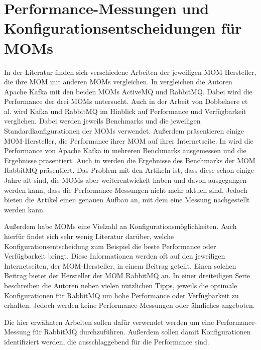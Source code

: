 \section{Performance-Messungen und Konfigurationsentscheidungen für MOMs}
\label{sec:config_mom}
In der Literatur finden sich verschiedene Arbeiten der jeweiligen MOM-Hersteller, die ihre MOM mit anderen MOMs vergleichen. In \cite{kafka} vergleichen die Autoren Apache Kafka mit den beiden MOMs ActiveMQ und RabbitMQ. Dabei wird die Performance der drei MOMs untersucht. Auch in der Arbeit von Dobbelaere et al. \cite{Dobbelaere2017} wird Kafka und RabbitMQ im Hinblick auf Performance und Verfügbarkeit verglichen. Dabei werden jeweils Benchmarks und die jeweiligen Standardkonfigurationen der MOMs verwendet. Außerdem präsentieren einige MOM-Hersteller, die Performance ihrer MOM auf ihrer Internetseite. In \cite{kafkaconfig} wird die Performance von Apache Kafka in mehreren Benchmarks ausgemessen und die Ergebnisse präsentiert. Auch in \cite{rabbitperf} werden die Ergebnisse des Benchmarks der MOM RabbitMQ präsentiert. Das Problem mit den Artikeln ist, dass diese schon einige Jahre alt sind, die MOMs aber weiterentwickelt haben und davon ausgegangen werden kann, dass die Performance-Messungen nicht mehr aktuell sind. Jedoch bieten die Artikel einen genauen Aufbau an, mit dem eine Messung nachgestellt werden kann. \par
Außerdem habe MOMs eine Vielzahl an Konfigurationsmöglichkeiten. Auch hierfür findet sich sehr wenig Literatur darüber, welche Konfigurationsentscheidung zum Beispiel die beste Performance oder Verfügbarkeit bringt. Diese Informationen werden oft auf den jeweiligen Internetseiten, der MOM-Hersteller, in einem Beitrag geteilt. Einen solchen Beitrag bietet der Hersteller der MOM RabbitMQ an. In einer dreiteiligen Serie \cite{rabbitconfig} beschreiben die Autoren neben vielen nützlichen Tipps, jeweils die optimale Konfigurationen für RabbitMQ um hohe Performance oder Verfügbarkeit zu erhalten. Jedoch werden keine Performance-Messungen oder ähnliches angeboten.\par
Die hier erwähnten Arbeiten sollen dafür verwendet werden um eine Performance-Messung für RabbitMQ durchzuführen. Außerdem sollen damit Konfigurationen identifiziert werden, die ausschlaggebend für die Performance sind.

